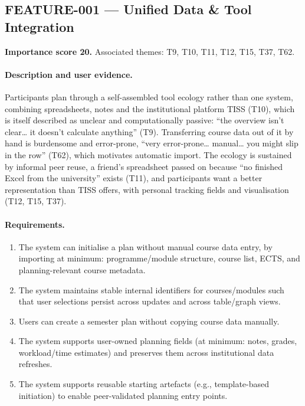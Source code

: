 
\subsection{FEATURE-001 --- Unified Data \& Tool Integration}
\label{feat:001}
\textbf{Importance score 20.} Associated themes: T9, T10, T11, T12, T15, T37, T62.

\paragraph{Description and user evidence.}
Participants plan through a self-assembled tool ecology rather than one system, combining spreadsheets, notes and the institutional platform TISS (T10), which is itself described as unclear and computationally passive: \enquote{the overview isn't clear… it doesn't calculate anything} (T9). Transferring course data out of it by hand is burdensome and error-prone, \enquote{very error-prone… manual… you might slip in the row} (T62), which motivates automatic import. The ecology is sustained by informal peer reuse, a friend's spreadsheet passed on because \enquote{no finished Excel from the university} exists (T11), and participants want a better representation than TISS offers, with personal tracking fields and visualisation (T12, T15, T37).

\paragraph{Requirements.}
\begin{enumerate}
    \item The system can initialise a plan without manual course data entry, by importing at minimum: programme/module structure, course list, ECTS, and planning-relevant course metadata.
    \item The system maintains stable internal identifiers for courses/modules such that user selections persist across updates and across table/graph views.
    \item Users can create a semester plan without copying course data manually.
    \item The system supports user-owned planning fields (at minimum: notes, grades, workload/time estimates) and preserves them across institutional data refreshes.
    \item The system supports reusable starting artefacts (e.g., template-based initiation) to enable peer-validated planning entry points.
\end{enumerate}

